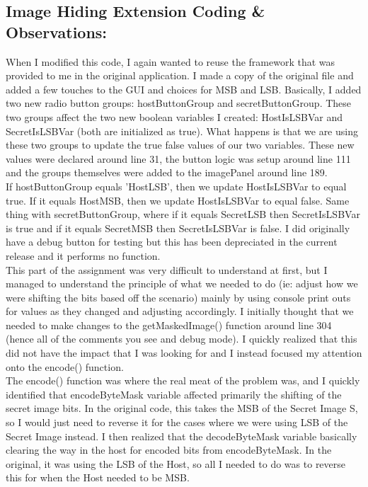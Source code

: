 \documentclass[10pt]{article}
\begin{document}
\subsection{Image Hiding Extension Coding \& Observations: } 
\noindent When I modified this code, I again wanted to reuse the framework that was provided to me in the original application. I made a copy of the original file and added a few touches to the GUI and choices for MSB and LSB. Basically, I added two new radio button groups: hostButtonGroup and secretButtonGroup. These two groups affect the two new boolean variables I created: HostIsLSBVar and SecretIsLSBVar (both are initialized as true). What happens is that we are using these two groups to update the true false values of our two variables. These new values were declared around line 31, the button logic was setup around line 111 and the groups themselves were added to the imagePanel around line 189.\\ 
If hostButtonGroup equals 'HostLSB', then we update HostIsLSBVar to equal true. If it equals HostMSB, then we update HostIsLSBVar to equal false. Same thing with secretButtonGroup, where if it equals SecretLSB then SecretIsLSBVar is true and if it equals SecretMSB then SecretIsLSBVar is false. I did originally have a debug button for testing but this has been depreciated in the current release and it performs no function.\\
\newline
 This part of the assignment was very difficult to understand at first, but I managed to understand the principle of what we needed to do (ie: adjust how we were shifting the bits based off the scenario) mainly by using console print outs for values as they changed and adjusting accordingly. I initially thought that we needed to make changes to the getMaskedImage() function around line 304 (hence all of the comments you see and debug mode). I quickly realized that this did not have the impact that I was looking for and I instead focused my attention onto the encode() function.\\
 The encode() function was where the real meat of the problem was, and I quickly identified that encodeByteMask variable affected primarily the shifting of the secret image bits. In the original code, this takes the MSB of the Secret Image S, so I would just need to reverse it for the cases where we were using LSB of the Secret Image instead. I then realized that the decodeByteMask variable basically clearing the way in the host for encoded bits from encodeByteMask. In the original, it was using the LSB of the Host, so all I needed to do was to reverse this for when the Host needed to be MSB.\\
\end{document}
